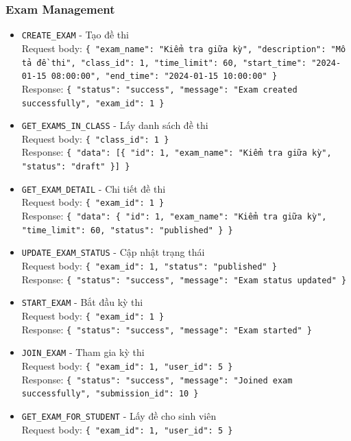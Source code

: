 \documentclass[12pt,a4paper]{report}
\newcommand{\json}[1]{\texttt{\allowbreak#1\allowbreak}}
\begin{document}
\subsubsection{Exam Management}
\begin{itemize}
    \item \texttt{CREATE\_EXAM} - Tạo đề thi \\
    Request body: \json{\{ "exam\_name": "Kiểm tra giữa kỳ", "description": "Mô tả đề thi", "class\_id": 1, "time\_limit": 60, "start\_time": "2024-01-15 08:00:00", "end\_time": "2024-01-15 10:00:00" \}} \\
    Response: \json{\{ "status": "success", "message": "Exam created successfully", "exam\_id": 1 \}}
    \item \texttt{GET\_EXAMS\_IN\_CLASS} - Lấy danh sách đề thi \\
    Request body: \json{\{ "class\_id": 1 \}} \\
    Response: \json{\{ "data": [\{ "id": 1, "exam\_name": "Kiểm tra giữa kỳ", "status": "draft" \}] \}}
    \item \texttt{GET\_EXAM\_DETAIL} - Chi tiết đề thi \\
    Request body: \json{\{ "exam\_id": 1 \}} \\
    Response: \json{\{ "data": \{ "id": 1, "exam\_name": "Kiểm tra giữa kỳ", "time\_limit": 60, "status": "published" \} \}}
    \item \texttt{UPDATE\_EXAM\_STATUS} - Cập nhật trạng thái \\
    Request body: \json{\{ "exam\_id": 1, "status": "published" \}} \\
    Response: \json{\{ "status": "success", "message": "Exam status updated" \}}
    \item \texttt{START\_EXAM} - Bắt đầu kỳ thi \\
    Request body: \json{\{ "exam\_id": 1 \}} \\
    Response: \json{\{ "status": "success", "message": "Exam started" \}}
    \item \texttt{JOIN\_EXAM} - Tham gia kỳ thi \\
    Request body: \json{\{ "exam\_id": 1, "user\_id": 5 \}} \\
    Response: \json{\{ "status": "success", "message": "Joined exam successfully", "submission\_id": 10 \}}
    \item \texttt{GET\_EXAM\_FOR\_STUDENT} - Lấy đề cho sinh viên \\
    Request body: \json{\{ "exam\_id": 1, "user\_id": 5 \}} \\

\end{itemize}
\end{document}
